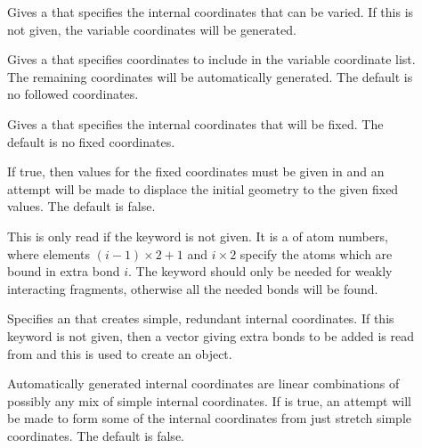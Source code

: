 \begin{description}
  \item[] Gives a 
     that specifies the internal coordinates
    that can be varied. If this is not given, the variable coordinates will
    be generated.

  \item[] Gives a 
     that specifies coordinates to include in
    the variable coordinate list.  The remaining coordinates will be
    automatically generated.  The default is no followed coordinates.

  \item[] Gives a 
     that specifies the internal coordinates
    that will be fixed.  The default is no fixed coordinates.

  \item[] If true, then values for the fixed
    coordinates must be given in  and an attempt will be made
    to displace the initial geometry to the given fixed values. The default
    is false.

  \item[] This is only read if the 
     keyword is not given.  It is a  of atom
     numbers, where elements $(i-1)\times 2 + 1$ and $i\times 2$ specify
     the atoms which are bound in extra bond $i$.  The 
     keyword should only be needed for weakly interacting fragments,
     otherwise all the needed bonds will be found.

  \item[] Specifies an 
     that creates simple, redundant internal
    coordinates. If this keyword is not given, then a vector giving extra
    bonds to be added is read from  and this is used to
    create an  object.

  \item[] Automatically generated internal
    coordinates are linear combinations of possibly any mix of simple
    internal coordinates.  If  is true, an attempt
    will be made to form some of the internal coordinates from just stretch
    simple coordinates.  The default is false.


\end{description}
